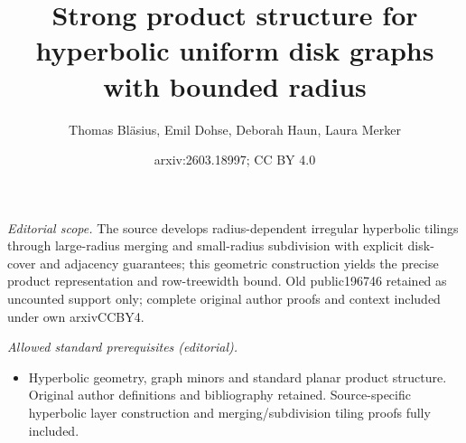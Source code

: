 \documentclass[11pt]{article}
\title{Strong product structure for hyperbolic uniform disk graphs with bounded radius}
\author{Thomas Bläsius, Emil Dohse, Deborah Haun, Laura Merker}
\date{arxiv:2603.18997; CC BY 4.0}
\begin{document}
\maketitle
\noindent\textit{Editorial scope.} The source develops radius-dependent irregular hyperbolic tilings through large-radius merging and small-radius subdivision with explicit disk-cover and adjacency guarantees; this geometric construction yields the precise product representation and row-treewidth bound. Old public196746 retained as uncounted support only; complete original author proofs and context included under own arxivCCBY4.\par\medskip
\noindent\textit{Allowed standard prerequisites (editorial).}\begin{itemize}
\item Hyperbolic geometry, graph minors and standard planar product structure. Original author definitions and bibliography retained. Source-specific hyperbolic layer construction and merging/subdivision tiling proofs fully included.
\end{itemize}\medskip
\end{document}
